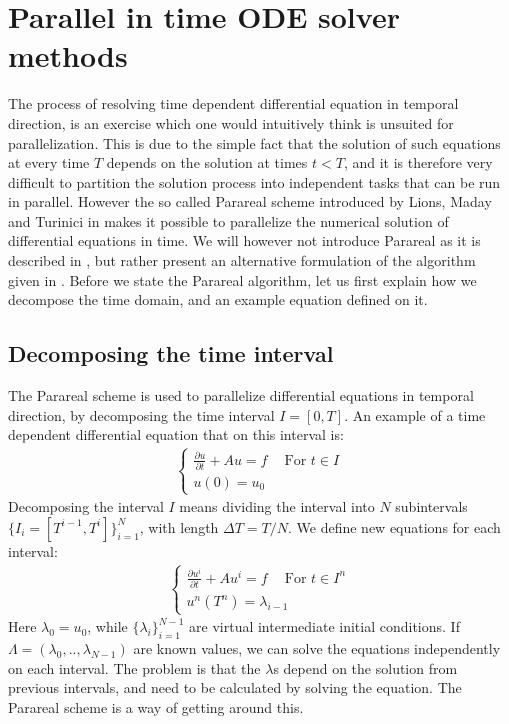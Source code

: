 \chapter{Parallel in time ODE solver methods} \label{parareal_chap}
The process of resolving time dependent differential equation in temporal direction, is an exercise which one would intuitively think is unsuited for parallelization. This is due to the simple fact that the solution of such equations at every time $T$ depends on the solution at times $t<T$, and it is therefore very difficult to partition the solution process into independent tasks that can be run in parallel. However the so called Parareal scheme introduced by Lions, Maday and Turinici in \cite{lions2001resolution} makes it possible to parallelize the numerical solution of differential equations in time. We will however not introduce Parareal as it is described in \cite{lions2001resolution}, but rather present an alternative formulation of the algorithm given in \cite{baffico2002parallel}. Before we state the Parareal algorithm, let us first explain how we decompose the time domain, and an example equation defined on it.
\section{Decomposing the time interval} \label{Para_dcomp_sec}
The Parareal scheme is used to parallelize differential equations in temporal direction, by decomposing the time interval $I=[0,T]$. An example of a time dependent differential equation that on this interval is:
\begin{align}
\left\{
   	\begin{array}{lr}
		\frac{\partial u}{\partial t} + Au = f \ \quad \textrm{For $t \in I$} \\
		u(0)=u_0
	\end{array}
   \right. \label{unbroken}
\end{align} 
Decomposing the interval $I$ means dividing the interval into $N$ subintervals $\{I_i = [T^{i-1},T^{i}]\}_{i=1}^{N}$, with length $\Delta T = T/N$. We define new equations for each interval:
\begin{align}
\left\{
     \begin{array}{lr}
		\frac{\partial u^i}{\partial t} + Au^i = f \ \quad \textrm{For $t \in I^n$} \\
		u^n(T^n)=\lambda_{i-1}
	\end{array}
	\right.	\label{broken}
\end{align}
Here $\lambda_0=u_0$, while $\{\lambda_i\}_{i=1}^{N-1}$ are virtual intermediate initial conditions. If $\Lambda=(\lambda_0,..,\lambda_{N-1})$ are known values, we can solve the equations independently on each interval. The problem is that the $\lambda$s depend on the solution from previous intervals, and need to be calculated by solving the equation. The Parareal scheme is a way of getting around this.
